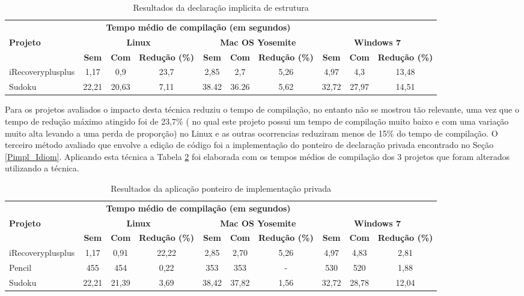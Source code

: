 \begin{table}[!ht]
\tiny
\centering
\caption{Resultados da declaração implicita de estrutura}
\label{tab:forward_declaration}
\begin{tabular}{lccccccccc}
& \multicolumn{6}{c}{\textbf{Tempo médio de compilação (em segundos)} } \\
\textbf{Projeto} & \multicolumn{3}{c}{\textbf{Linux}} & \multicolumn{3}{c}{\textbf{Mac OS Yosemite}} & \multicolumn{3}{c}{\textbf{Windows 7}} \\ 
& \textbf{Sem } & \textbf{Com }  & \textbf{Redução (\%)} & \textbf{Sem } & \textbf{Com }  & \textbf{Redução (\%)} & \textbf{Sem } & \textbf{Com }  & \textbf{Redução (\%)} \\
\toprule
iRecoveryplusplus &  1,17  &   0,9   & 23,7  &   2,85  &  2,7   & 5,26 &  4,97 & 4,3   & 13,48 \\
Sudoku            & 22,21  & 20,63   & 7,11  &  38.42  & 36.26  & 5,62  & 32,72 & 27,97 & 14,51  \\ 
\end{tabular}
\end{table}

Para os projetos avaliados o impacto desta técnica reduziu o tempo de compilação, no entanto não se mostrou tão relevante, uma vez que o tempo de redução máximo atingido foi de 23,7\% ( no qual este projeto possui um tempo de compilação muito baixo e com uma variação muito alta levando a uma perda de proporção) no Linux e as outras ocorrencias reduziram menos de 15\% do tempo de compilação. 
O terceiro método avaliado que envolve a edição de código foi a implementação do ponteiro de declaração privada encontrado no Seção \ref{Pimpl_Idiom}. Aplicando esta técnica a Tabela \ref{tab:pimpl} foi elaborada com os tempos médios de compilação dos 3 projetos que foram alterados utilizando a técnica.

\begin{table}[!ht]
\tiny
\centering
\caption{Resultados da aplicação ponteiro de implementação privada }
\label{tab:pimpl}
\begin{tabular}{lccccccccc}
& \multicolumn{6}{c}{\textbf{Tempo médio de compilação (em segundos)} } \\
\textbf{Projeto} & \multicolumn{3}{c}{\textbf{Linux}} & \multicolumn{3}{c}{\textbf{Mac OS Yosemite}} & \multicolumn{3}{c}{\textbf{Windows 7}} \\ 
& \textbf{Sem } & \textbf{Com }  & \textbf{Redução (\%)} & \textbf{Sem } & \textbf{Com }  & \textbf{Redução (\%)} & \textbf{Sem } & \textbf{Com }  & \textbf{Redução (\%)} \\
\toprule
iRecoveryplusplus  &   1,17   &  0,91   & 22,22   & 2,85  & 2,70   & 5,26  & 4,97 & 4,83 & 2,81 \\ 
Pencil             &   455    &  454    & 0,22    & 353   & 353    & -     & 530 & 520   & 1,88 \\
Sudoku             &   22,21  & 21,39   & 3,69    & 38,42 & 37,82  & 1,56  & 32,72 & 28,78 & 12,04 \\ 
\end{tabular}
\end{table}

